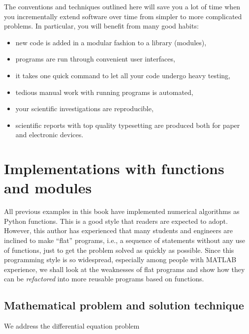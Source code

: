 \documentclass[%
oneside,                 %
final,                   %
10pt]{article}
\begin{document}
The conventions and techniques outlined here will save you a lot of time
when you incrementally extend software over time from simpler to more
complicated problems. In particular, you will benefit from
many good habits:

\begin{itemize}
 \item new code is added in a modular fashion to a library (modules),

 \item programs are run through convenient user interfaces,

 \item it takes one quick command to let all your code undergo heavy testing,

 \item tedious manual work with running programs is automated,

 \item your scientific investigations are reproducible,

 \item scientific reports with top quality typesetting are produced both
   for paper and electronic devices.
\end{itemize}

\noindent
\section{Implementations with functions and modules}
\label{softeng1:basic}

All previous examples in this book have implemented numerical
algorithms as Python functions. This is a good style that readers
are expected to adopt. However, this author has experienced that
many students and engineers are inclined to make ``flat'' programs,
i.e., a sequence of statements without any use of functions, just to
get the problem solved as quickly as possible. Since this programming
style is so widespread, especially among people with MATLAB experience,
we shall look at the weaknesses of flat programs and show how they
can be \emph{refactored} into more reusable programs based on functions.

\subsection{Mathematical problem and solution technique}
\label{softeng1:basic:math}

We address the differential equation problem
\end{document}
